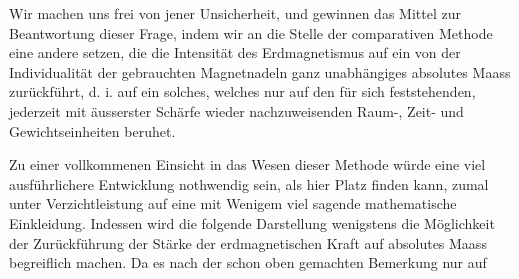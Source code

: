 Wir machen uns frei von jener Unsicherheit, und gewinnen das Mittel zur Beantwortung dieser Frage, indem wir an die Stelle der comparativen Methode eine andere setzen, die die Intensität des Erdmagnetismus auf ein von der Individualität der gebrauchten Magnetnadeln ganz unabhängiges absolutes Maass zurückführt, d. i. auf ein solches, welches nur auf den für sich feststehenden, jederzeit mit äusserster Schärfe wieder nachzuweisenden Raum-, Zeit- und Gewichtseinheiten beruhet.

Zu einer vollkommenen Einsicht in das Wesen dieser Methode würde eine viel ausführlichere Entwicklung nothwendig sein, als hier Platz finden kann, zumal unter Verzichtleistung auf eine mit Wenigem viel sagende mathematische Einkleidung. Indessen wird die folgende Darstellung wenigstens die Möglichkeit der Zurückführung der Stärke der erdmagnetischen Kraft auf absolutes Maass begreiflich machen. Da es nach der schon oben gemachten Bemerkung nur auf
